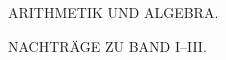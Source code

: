\thispagestyle{empty}
\vspace*{12em}
\begin{center}
{\Large ARITHMETIK UND ALGEBRA.\par}
\vspace{2em}
NACHTRÄGE ZU BAND I--III.
\end{center}
\clearpage
